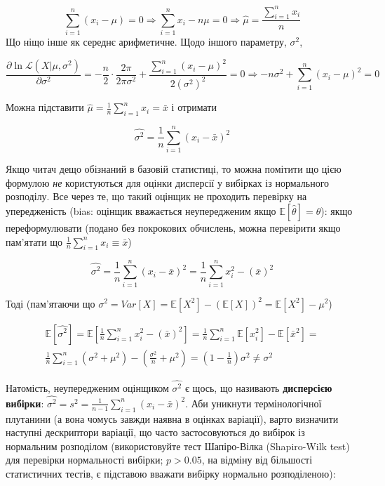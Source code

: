 \documentclass[
  11pt,
]{book}
\begin{document}
\[\sum \limits_{i=1}^n (x_i - \mu) = 0 \Rightarrow \sum \limits_{i=1}^n x_i - n \mu = 0 \Rightarrow \hat{\mu} = \frac{\sum \limits_{i=1}^n x_i}{n}\]
Що ніщо інше як середнє арифметичне. Щодо іншого параметру, \(\sigma^2\),

\[\frac{\partial \ln \mathcal{L}(X | \mu, \sigma^2)}{\partial \sigma^2} = - \frac{n}{2} \cdot \frac{2 \pi}{2 \pi \sigma^2} + \frac{\sum \limits_{i=1}^n (x_i - \mu)^2}{2 (\sigma^2)^2} = 0 \Rightarrow -n \sigma^2 + \sum \limits_{i=1}^n (x_i - \mu)^2 = 0\]

Можна підставити \(\hat{\mu} = \frac{1}{n} \sum \limits_{i=1}^n x_i = \bar{x}\) і отримати

\[\hat{\sigma^2} = \frac{1}{n} \sum \limits_{i=1}^n (x_i - \bar{x})^2\]

Якщо читач дещо обізнаний в базовій статистиці, то можна помітити що цією формулою \emph{не} користуються для оцінки дисперсії у вибірках із нормального розподілу. Все через те, що такий оцінщик не проходить перевірку на упередженість (bias: оцінщик вважається неупередженим якщо \(\mathbb{E}[\hat{\theta}] = \theta\)): якщо переформулювати (подано без покрокових обчислень, можна перевірити якщо пам'ятати що \(\frac{1}{n} \sum \limits_{i=1}^n x_i \equiv \bar{x}\))

\[\hat{\sigma^2} = \frac{1}{n} \sum \limits_{i=1}^n (x_i - \bar{x})^2 = \frac{1}{n} \sum \limits_{i=1}^n x_i^2 - (\bar{x})^2\]

Тоді (пам'ятаючи що \(\sigma^2 = Var[X] = \mathbb{E} [X^2] - (\mathbb{E} [X])^2 = \mathbb{E} [X^2] - \mu^2\))

\[
\begin{aligned}
  \mathbb{E} [\hat{\sigma^2}] = \mathbb{E} \left[ \frac{1}{n} \sum \limits_{i=1}^n x_i^2 - (\bar{x})^2 \right] = \frac{1}{n} \sum \limits_{i = 1}^n \mathbb{E} [x_i^2] - \mathbb{E} [\bar{x}^2] = \\
  \frac{1}{n}  \sum \limits_{i = 1}^n (\sigma^2 + \mu^2) - (\frac{\sigma^2}{n} + \mu^2) = (1 - \frac{1}{n}) \sigma^2 \neq \sigma^2
\end{aligned}
\]

Натомість, неупередженим оцінщиком \(\hat{\sigma^2}\) є щось, що називають \textbf{дисперсією вибірки}: \(\hat{\sigma^2} = s^2 = \frac{1}{n-1} \sum \limits_{i=1}^n (x_i - \bar{x})^2\). Аби уникнути термінологічної плутанини (а вона чомусь завжди наявна в оцінках варіації), варто визначити наступні дескриптори варіації, що часто застосовуються до вибірок із нормальним розподілом (використовуйте тест Шапіро-Вілка (Shapiro-Wilk test) для перевірки нормальності вибірки; \(p > 0.05\), на відміну від більшості статистичних тестів, є підставою вважати вибірку нормально розподіленою):
\end{document}
